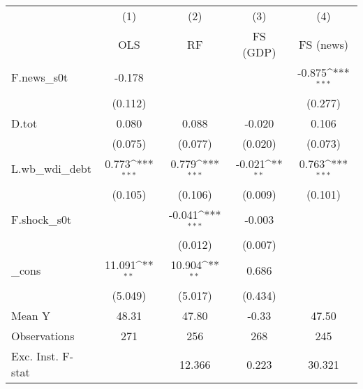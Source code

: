 {
\def\sym#1{\ifmmode^{#1}\else\(^{#1}\)\fi}
\begin{tabular}{l*{4}{c}}
\toprule
            &\multicolumn{1}{c}{(1)}&\multicolumn{1}{c}{(2)}&\multicolumn{1}{c}{(3)}&\multicolumn{1}{c}{(4)}\\
            &\multicolumn{1}{c}{OLS}&\multicolumn{1}{c}{RF}&\multicolumn{1}{c}{FS (GDP)}&\multicolumn{1}{c}{FS (news)}\\
\midrule
F.news\_s0t  &      -0.178         &                     &                     &      -0.875\sym{***}\\
            &     (0.112)         &                     &                     &     (0.277)         \\
\addlinespace
D.tot       &       0.080         &       0.088         &      -0.020         &       0.106         \\
            &     (0.075)         &     (0.077)         &     (0.020)         &     (0.073)         \\
\addlinespace
L.wb\_wdi\_debt&       0.773\sym{***}&       0.779\sym{***}&      -0.021\sym{**} &       0.763\sym{***}\\
            &     (0.105)         &     (0.106)         &     (0.009)         &     (0.101)         \\
\addlinespace
F.shock\_s0t &                     &      -0.041\sym{***}&      -0.003         &                     \\
            &                     &     (0.012)         &     (0.007)         &                     \\
\addlinespace
\_cons      &      11.091\sym{**} &      10.904\sym{**} &       0.686         &                     \\
            &     (5.049)         &     (5.017)         &     (0.434)         &                     \\
\midrule
Mean Y      &       48.31         &       47.80         &       -0.33         &       47.50         \\
Observations&         271         &         256         &         268         &         245         \\
Exc. Inst. F-stat&                     &      12.366         &       0.223         &      30.321         \\
\bottomrule
\end{tabular}
}
